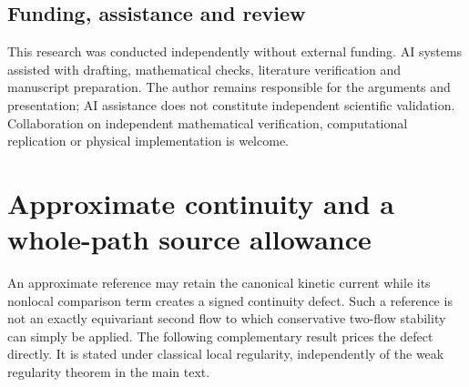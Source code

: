 \documentclass[11pt]{article}
\numberwithin{equation}{section}
\theoremstyle{definition}
\theoremstyle{remark}
\begin{document}
\subsection*{Funding, assistance and review}
This research was conducted independently without external funding. AI systems assisted with drafting, mathematical checks, literature verification and manuscript preparation. The author remains responsible for the arguments and presentation; AI assistance does not constitute independent scientific validation. Collaboration on independent mathematical verification, computational replication or physical implementation is welcome.

\appendix
\section{Approximate continuity and a whole-path source allowance}\label{p3r:signed-source}
An approximate reference may retain the canonical kinetic current while its nonlocal comparison term creates a signed continuity defect. Such a reference is not an exactly equivariant second flow to which conservative two-flow stability can simply be applied. The following complementary result prices the defect directly. It is stated under classical local regularity, independently of the weak regularity theorem in the main text.
\end{document}
